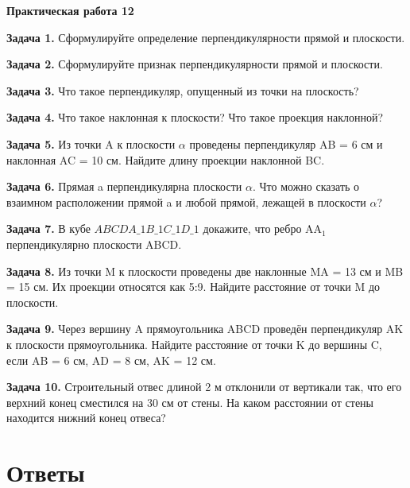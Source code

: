 \documentclass{umk-matematika}
\begin{document}
\begin{center}
{\Large\bfseries Практическая работа 12}
\end{center}
\vspace{0.5cm}

\textbf{Задача 1.} Сформулируйте определение перпендикулярности прямой и плоскости.\par\vspace{10pt}
\textbf{Задача 2.} Сформулируйте признак перпендикулярности прямой и плоскости.\par\vspace{10pt}
\textbf{Задача 3.} Что такое перпендикуляр, опущенный из точки на плоскость?\par\vspace{10pt}
\textbf{Задача 4.} Что такое наклонная к плоскости? Что такое проекция наклонной?\par\vspace{10pt}
\textbf{Задача 5.} Из точки A к плоскости $\alpha$ проведены перпендикуляр AB = 6 см и наклонная AC = 10 см. Найдите длину проекции наклонной BC.\par\vspace{10pt}
\textbf{Задача 6.} Прямая a перпендикулярна плоскости $\alpha$. Что можно сказать о взаимном расположении прямой a и любой прямой, лежащей в плоскости $\alpha$?\par\vspace{10pt}
\textbf{Задача 7.} В кубе $ABCDA\_1B\_1C\_1D\_1$ докажите, что ребро AA$_1$ перпендикулярно плоскости ABCD.\par\vspace{10pt}
\textbf{Задача 8.} Из точки M к плоскости проведены две наклонные MA = 13 см и MB = 15 см. Их проекции относятся как 5:9. Найдите расстояние от точки M до плоскости.\par\vspace{10pt}
\textbf{Задача 9.} Через вершину A прямоугольника ABCD проведён перпендикуляр AK к плоскости прямоугольника. Найдите расстояние от точки K до вершины C, если AB = 6 см, AD = 8 см, AK = 12 см.\par\vspace{10pt}
\textbf{Задача 10.} Строительный отвес длиной 2 м отклонили от вертикали так, что его верхний конец сместился на 30 см от стены. На каком расстоянии от стены находится нижний конец отвеса?\par\vspace{10pt}
\newpage
\section*{Ответы}
\end{document}
